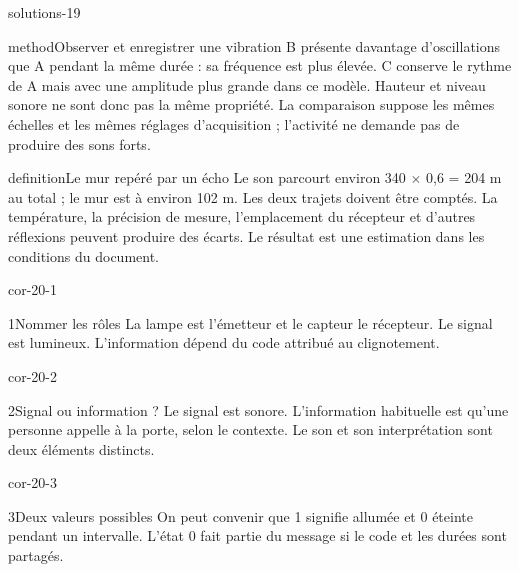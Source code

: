 \documentclass[12pt,twoside,openany]{book}
\begin{document}
\label{solutions-19}
\begin{pcFiche}{solutions-19}
\begin{pcEncadre}{method}{Observer et enregistrer une vibration}
B présente davantage d’oscillations que A pendant la même durée : sa fréquence est plus élevée. C conserve le rythme de A mais avec une amplitude plus grande dans ce modèle. Hauteur et niveau sonore ne sont donc pas la même propriété. La comparaison suppose les mêmes échelles et les mêmes réglages d’acquisition ; l’activité ne demande pas de produire des sons forts.\par
\end{pcEncadre}
\label{defi-cor-19}
\begin{pcEncadre}{definition}{Le mur repéré par un écho}
Le son parcourt environ 340 \(\times\) 0,6 = 204 m au total ; le mur est à environ 102 m. Les deux trajets doivent être comptés. La température, la précision de mesure, l’emplacement du récepteur et d’autres réflexions peuvent produire des écarts. Le résultat est une estimation dans les conditions du document.\par
\end{pcEncadre}
\end{pcFiche}
\clearpage{}
\begin{blocLivre}{cor-20-1}
\begin{corrige}{1}{Nommer les rôles}
La lampe est l’émetteur et le capteur le récepteur. Le signal est lumineux. L’information dépend du code attribué au clignotement.\par
\end{corrige}\end{blocLivre}
\begin{blocLivre}{cor-20-2}
\begin{corrige}{2}{Signal ou information ?}
Le signal est sonore. L’information habituelle est qu’une personne appelle à la porte, selon le contexte. Le son et son interprétation sont deux éléments distincts.\par
\end{corrige}\end{blocLivre}
\begin{blocLivre}{cor-20-3}
\begin{corrige}{3}{Deux valeurs possibles}
On peut convenir que 1 signifie allumée et 0 éteinte pendant un intervalle. L’état 0 fait partie du message si le code et les durées sont partagés.\par
\end{corrige}\end{blocLivre}
\end{document}
